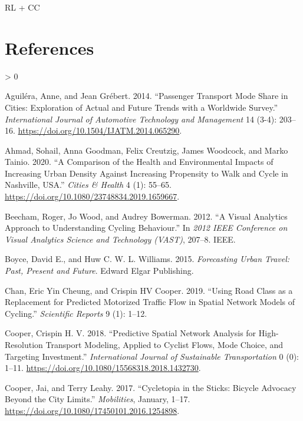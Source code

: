\documentclass[galley]{jtlu-article-2col}
\newlength{\cslhangindent}
\newenvironment{CSLReferences}[2] %
 {%
  \setlength{\parindent}{0pt}
  \ifodd #1 \everypar{\setlength{\hangindent}{\cslhangindent}}\ignorespaces\fi
  \ifnum #2 > 0
  \setlength{\parskip}{#2\baselineskip}
  \fi
 }%
 {}
\begin{document}
RL + CC

\hypertarget{references}{%
\section*{References}\label{references}}

\hypertarget{refs}{}
\begin{CSLReferences}{1}{0}
\leavevmode\hypertarget{ref-aguilera_passenger_2014}{}%
Aguiléra, Anne, and Jean Grébert. 2014. {``Passenger Transport Mode Share in Cities: Exploration of Actual and Future Trends with a Worldwide Survey.''} \emph{International Journal of Automotive Technology and Management} 14 (3-4): 203--16. \url{https://doi.org/10.1504/IJATM.2014.065290}.

\leavevmode\hypertarget{ref-ahmad_comparison_2020}{}%
Ahmad, Sohail, Anna Goodman, Felix Creutzig, James Woodcock, and Marko Tainio. 2020. {``A Comparison of the Health and Environmental Impacts of Increasing Urban Density Against Increasing Propensity to Walk and Cycle in {Nashville}, {USA}.''} \emph{Cities \& Health} 4 (1): 55--65. \url{https://doi.org/10.1080/23748834.2019.1659667}.

\leavevmode\hypertarget{ref-beecham_visual_2012}{}%
Beecham, Roger, Jo Wood, and Audrey Bowerman. 2012. {``A Visual Analytics Approach to Understanding Cycling Behaviour.''} In \emph{2012 {IEEE Conference} on {Visual Analytics Science} and {Technology} ({VAST})}, 207--8. {IEEE}.

\leavevmode\hypertarget{ref-boyce_forecasting_2015}{}%
Boyce, David E., and Huw C. W. L. Williams. 2015. \emph{Forecasting {Urban Travel}: {Past}, {Present} and {Future}}. {Edward Elgar Publishing}.

\leavevmode\hypertarget{ref-chan_using_2019}{}%
Chan, Eric Yin Cheung, and Crispin HV Cooper. 2019. {``Using Road Class as a Replacement for Predicted Motorized Traffic Flow in Spatial Network Models of Cycling.''} \emph{Scientific Reports} 9 (1): 1--12.

\leavevmode\hypertarget{ref-cooper_predictive_2018}{}%
Cooper, Crispin H. V. 2018. {``Predictive Spatial Network Analysis for High-Resolution Transport Modeling, Applied to Cyclist Flows, Mode Choice, and Targeting Investment.''} \emph{International Journal of Sustainable Transportation} 0 (0): 1--11. \url{https://doi.org/10.1080/15568318.2018.1432730}.

\leavevmode\hypertarget{ref-cooper_cycletopia_2017}{}%
Cooper, Jai, and Terry Leahy. 2017. {``Cycletopia in the Sticks: Bicycle Advocacy Beyond the City Limits.''} \emph{Mobilities}, January, 1--17. \url{https://doi.org/10.1080/17450101.2016.1254898}.


\end{CSLReferences}
\end{document}
